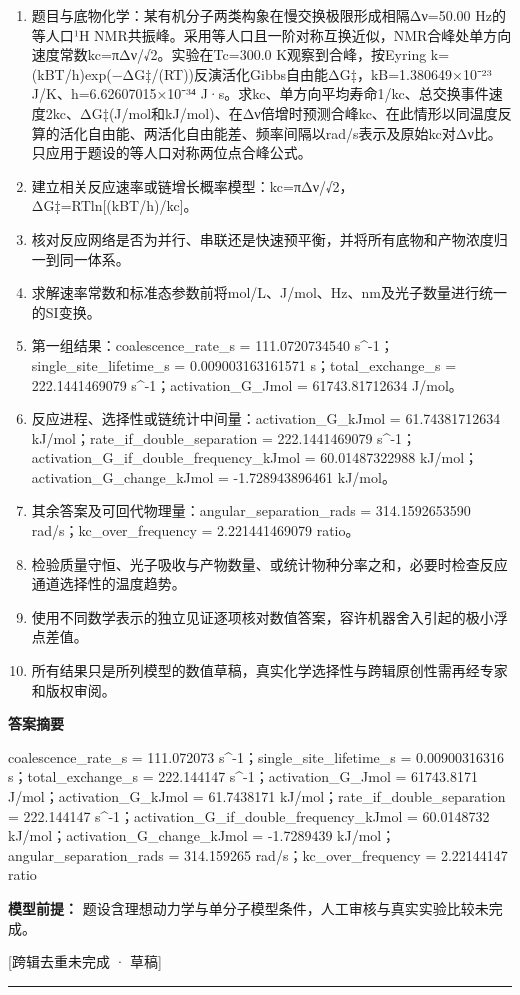 \documentclass[UTF8,11pt,a4paper]{ctexart}
\begin{document}
\begin{enumerate}
\item 题目与底物化学：某有机分子两类构象在慢交换极限形成相隔Δν=50.00 Hz的等人口¹H NMR共振峰。采用等人口且一阶对称互换近似，NMR合峰处单方向速度常数kc=πΔν/√2。实验在Tc=300.0 K观察到合峰，按Eyring k=(kBT/h)exp(−ΔG‡/(RT))反演活化Gibbs自由能ΔG‡，kB=1.380649×10⁻²³ J/K、h=6.62607015×10⁻³⁴ J·s。求kc、单方向平均寿命1/kc、总交换事件速度2kc、ΔG‡(J/mol和kJ/mol)、在Δν倍增时预测合峰kc、在此情形以同温度反算的活化自由能、两活化自由能差、频率间隔以rad/s表示及原始kc对Δν比。只应用于题设的等人口对称两位点合峰公式。
\item 建立相关反应速率或链增长概率模型：kc=πΔν/√2，ΔG‡=RTln[(kBT/h)/kc]。
\item 核对反应网络是否为并行、串联还是快速预平衡，并将所有底物和产物浓度归一到同一体系。
\item 求解速率常数和标准态参数前将mol/L、J/mol、Hz、nm及光子数量进行统一的SI变换。
\item 第一组结果：coalescence\_rate\_s = 111.0720734540 s\textasciicircum{}-1；single\_site\_lifetime\_s = 0.009003163161571 s；total\_exchange\_s = 222.1441469079 s\textasciicircum{}-1；activation\_G\_Jmol = 61743.81712634 J/mol。
\item 反应进程、选择性或链统计中间量：activation\_G\_kJmol = 61.74381712634 kJ/mol；rate\_if\_double\_separation = 222.1441469079 s\textasciicircum{}-1；activation\_G\_if\_double\_frequency\_kJmol = 60.01487322988 kJ/mol；activation\_G\_change\_kJmol = -1.728943896461 kJ/mol。
\item 其余答案及可回代物理量：angular\_separation\_rads = 314.1592653590 rad/s；kc\_over\_frequency = 2.221441469079 ratio。
\item 检验质量守恒、光子吸收与产物数量、或统计物种分率之和，必要时检查反应通道选择性的温度趋势。
\item 使用不同数学表示的独立见证逐项核对数值答案，容许机器舍入引起的极小浮点差值。
\item 所有结果只是所列模型的数值草稿，真实化学选择性与跨辑原创性需再经专家和版权审阅。
\end{enumerate}
\noindent\textbf{答案摘要}\par
coalescence\_rate\_s = 111.072073 s\textasciicircum{}-1；single\_site\_lifetime\_s = 0.00900316316 s；total\_exchange\_s = 222.144147 s\textasciicircum{}-1；activation\_G\_Jmol = 61743.8171 J/mol；activation\_G\_kJmol = 61.7438171 kJ/mol；rate\_if\_double\_separation = 222.144147 s\textasciicircum{}-1；activation\_G\_if\_double\_frequency\_kJmol = 60.0148732 kJ/mol；activation\_G\_change\_kJmol = -1.7289439 kJ/mol；angular\_separation\_rads = 314.159265 rad/s；kc\_over\_frequency = 2.22144147 ratio\par
\noindent\textbf{模型前提：}
题设含理想动力学与单分子模型条件，人工审核与真实实验比较未完成。\par
\noindent\textcolor{red!65!black}{[跨辑去重未完成 · 草稿]} \par
\medskip\hrule\medskip
{}
\end{document}
